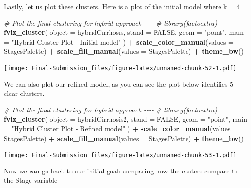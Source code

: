 \documentclass[
]{article}
\newenvironment{Shaded}{\begin{snugshade}}{\end{snugshade}}
\newcommand{\AttributeTok}[1]{\textcolor[rgb]{0.13,0.29,0.53}{#1}}
\newcommand{\CommentTok}[1]{\textcolor[rgb]{0.56,0.35,0.01}{\textit{#1}}}
\newcommand{\ConstantTok}[1]{\textcolor[rgb]{0.56,0.35,0.01}{#1}}
\newcommand{\FunctionTok}[1]{\textcolor[rgb]{0.13,0.29,0.53}{\textbf{#1}}}
\newcommand{\NormalTok}[1]{#1}
\newcommand{\SpecialCharTok}[1]{\textcolor[rgb]{0.81,0.36,0.00}{\textbf{#1}}}
\newcommand{\StringTok}[1]{\textcolor[rgb]{0.31,0.60,0.02}{#1}}
\begin{document}
Lastly, let us plot these clusters. Here is a plot of the initial model
where k = 4

\begin{Shaded}
\begin{Highlighting}[]
\CommentTok{\# Plot the final clustering for hybrid approach {-}{-}{-}{-}}
\CommentTok{\# library(factoextra)}
\FunctionTok{fviz\_cluster}\NormalTok{(}
  \AttributeTok{object =}\NormalTok{ hybridCirrhosis,}
  \AttributeTok{stand =} \ConstantTok{FALSE}\NormalTok{,}
  \AttributeTok{geom =} \StringTok{"point"}\NormalTok{,}
  \AttributeTok{main =} \StringTok{"Hybrid Cluster Plot {-} Initial model"}
\NormalTok{) }\SpecialCharTok{+}
  \FunctionTok{scale\_color\_manual}\NormalTok{(}\AttributeTok{values =}\NormalTok{ StagesPalette) }\SpecialCharTok{+}
  \FunctionTok{scale\_fill\_manual}\NormalTok{(}\AttributeTok{values =}\NormalTok{ StagesPalette) }\SpecialCharTok{+}
  \FunctionTok{theme\_bw}\NormalTok{() }
\end{Highlighting}
\end{Shaded}

\texttt{[image: Final-Submission\_files/figure-latex/unnamed-chunk-52-1.pdf]}

We can also plot our refined model, as you can see the plot below
identifies 5 clear clusters.

\begin{Shaded}
\begin{Highlighting}[]
\CommentTok{\# Plot the final clustering for hybrid approach {-}{-}{-}{-}}
\CommentTok{\# library(factoextra)}
\FunctionTok{fviz\_cluster}\NormalTok{(}
  \AttributeTok{object =}\NormalTok{ hybridCirrhosis2,}
  \AttributeTok{stand =} \ConstantTok{FALSE}\NormalTok{,}
  \AttributeTok{geom =} \StringTok{"point"}\NormalTok{,}
  \AttributeTok{main =} \StringTok{"Hybrid Cluster Plot {-} Refined model"}
\NormalTok{) }\SpecialCharTok{+}
  \FunctionTok{scale\_color\_manual}\NormalTok{(}\AttributeTok{values =}\NormalTok{ StagesPalette) }\SpecialCharTok{+}
  \FunctionTok{scale\_fill\_manual}\NormalTok{(}\AttributeTok{values =}\NormalTok{ StagesPalette) }\SpecialCharTok{+}
  \FunctionTok{theme\_bw}\NormalTok{() }
\end{Highlighting}
\end{Shaded}

\texttt{[image: Final-Submission\_files/figure-latex/unnamed-chunk-53-1.pdf]}

Now we can go back to our initial goal: comparing how the custers
compare to the Stage variable
\end{document}
